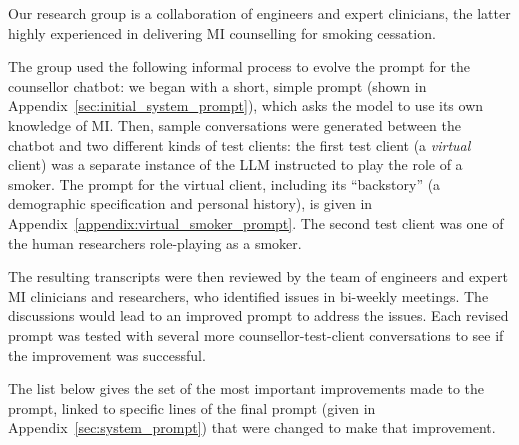 Our research group is a collaboration of engineers and expert clinicians, the latter highly experienced in delivering MI counselling for smoking cessation.

The group used the following informal process to evolve the prompt for the counsellor chatbot: we began with a short, simple prompt (shown in Appendix~\ref{sec:initial_system_prompt}), which asks the model to use its own knowledge of MI. Then, sample conversations were generated between the chatbot and two different kinds of test clients: the first test client (a \emph{virtual} client) was a separate instance of the LLM instructed to play the role of a smoker. The prompt for the virtual client, including its ``backstory'' (a demographic specification and personal history), is given in Appendix~\ref{appendix:virtual_smoker_prompt}. The second test client was one of the human researchers role-playing as a smoker.

The resulting transcripts were then reviewed by the team of engineers and expert MI clinicians and researchers, who identified issues in bi-weekly meetings. The discussions would lead to an improved prompt to address the issues. Each revised prompt was tested with several more counsellor-test-client conversations to see if the improvement was successful.

The list below gives the set of the most important improvements made to the prompt, linked to specific lines of the final prompt (given in Appendix~\ref{sec:system_prompt}) that were changed to make that improvement.

